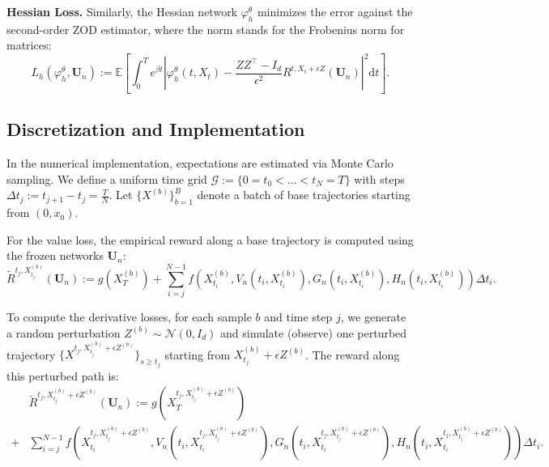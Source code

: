 \documentclass[twoside,11pt]{article}
\newcommand{\dd}{\mathrm{d}}
\newcommand{\E}{\mathbb{E}}
\newcommand{\1}{\mathbf{1}}
\numberwithin{equation}{section}
\begin{document}
\textbf{Hessian Loss.} Similarly, the Hessian network $\varphi^{\theta}_h$ minimizes the error against the second-order ZOD estimator, where the norm stands for the Frobenius norm for matrices:
\begin{equation}
    L_h(\varphi^{\theta}_h, \mathbf{U}_n) :=\E\left[\int_0^T e^{\beta t}\left| \varphi^{\theta}_h(t, X_t) - \frac{ZZ^{\top} - I_d}{\epsilon^2} R^{t,X_t+\epsilon Z}(\mathbf{U}_n) \right|^2 \dd t\right].
\end{equation}
\subsection{Discretization and Implementation}

In the numerical implementation, expectations are estimated via Monte Carlo sampling. We define a uniform time grid $\mathcal{G} := \{0=t_0 < \dots < t_N = T\}$ with steps $\Delta t_j := t_{j+1} - t_j = \frac{T}{N}$. Let $\{X^{(b)}\}_{b=1}^B$ denote a batch of base trajectories starting from $(0, x_0)$.

For the value loss, the empirical reward along a base trajectory is computed using the frozen networks $\mathbf{U}_n$:
\begin{equation}\label{eq: reward rv}
    \tilde R^{t_j,X^{(b)}_{t_j}}(\mathbf{U}_n) := g(X_T^{(b)}) + \sum_{i = j}^{N-1} f\left(X_{t_i}^{(b)}, V_{n}(t_i,X_{t_i}^{(b)}), G_n(t_i,X_{t_i}^{(b)}), H_n(t_i,X_{t_i}^{(b)})\right) \Delta t_i.
\end{equation}

To compute the derivative losses, for each sample $b$ and time step $j$, we generate a random perturbation $Z^{(b)} \sim \mathcal{N}(0, I_d)$ and simulate (observe) one perturbed trajectory $\{X^{t_j, X_{t_j}^{(b)}+ \epsilon Z^{(b)}}\}_{s \ge t_j}$ starting from $X_{t_j}^{(b)} + \epsilon Z^{(b)}$. The reward along this perturbed path is:
\begin{equation}\label{eq: reward der rv}
\begin{aligned}
    &\tilde R^{t_j, X_{t_j}^{(b)}+\epsilon Z^{(b)}}(\mathbf{U}_n) := g(X_T^{t_j,X_{t_j}^{(b)}+\epsilon Z^{(b)}}) \\
    +& \sum_{i = j}^{N-1} f\left(X_{t_i}^{t_j,X_{t_j}^{(b)}+\epsilon Z^{(b)}}, V_{n}(t_i,X_{t_i}^{t_j,X_{t_j}^{(b)}+\epsilon Z^{(b)}}), G_n(t_i,X_{t_i}^{t_j,X_{t_j}^{(b)}+\epsilon Z^{(b)}}), H_n(t_i,X_{t_i}^{t_j,X_{t_j}^{(b)}+\epsilon Z^{(b)}})\right) \Delta t_i.
    \end{aligned}
\end{equation}
\end{document}
